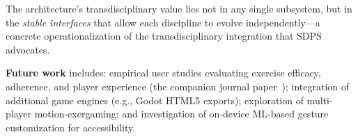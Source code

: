 \documentclass[runningheads]{llncs}
\newcommand{\citecompanion}{\cite{companion2026}}
\begin{document}
The architecture's transdisciplinary value lies not in any single
subsystem, but in the \emph{stable interfaces} that allow each
discipline to evolve independently---a concrete operationalization of
the transdisciplinary integration that SDPS advocates.

\textbf{Future work} includes: empirical user studies evaluating exercise
efficacy, adherence, and player experience (the companion journal
paper~\citecompanion{}); integration of additional game engines (e.g.,
Godot HTML5 exports); exploration of multi-player motion-exergaming; and
investigation of on-device ML-based gesture customization for
accessibility.



\end{document}

